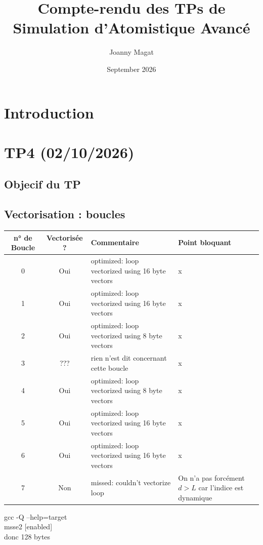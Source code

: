 \documentclass{article}
\title{Compte-rendu des TPs de\\Simulation d'Atomistique Avancé}
\author{Joanny Magat}
\date{September 2026}
\begin{document}
\maketitle

\section{Introduction}

\section{TP4 (02/10/2026)}

\subsection{Objecif du TP}

\subsection{Vectorisation : boucles}

\vspace{0.5cm}

\begin{tabularx}{\textwidth}{c c X X}
    \toprule
    n° de Boucle & Vectorisée ? & Commentaire & Point bloquant\\
    \midrule
    0 & Oui & optimized: loop vectorized using 16 byte vectors & x\\
    1 & Oui & optimized: loop vectorized using 16 byte vectors & x\\
    2 & Oui & optimized: loop vectorized using 8 byte vectors & x\\
    3 & ??? & rien n'est dit concernant cette boucle & x\\
    4 & Oui & optimized: loop vectorized using 8 byte vectors & x\\
    5 & Oui & optimized: loop vectorized using 16 byte vectors & x\\
    6 & Oui & optimized: loop vectorized using 16 byte vectors & x\\
    7 & Non & missed: couldn't vectorize loop & \makecell[l]{On n'a pas forcément $d > L$ \\ car l'indice est dynamique} \\
    \bottomrule
\end{tabularx}

\vspace{0.5cm}

gcc -Q --help=target \\
msse2 [enabled] \\
donc 128 bytes \\
\end{document}

